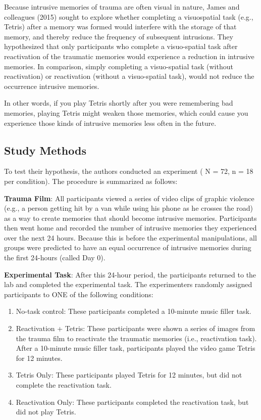 \documentclass[
]{book}
\providecommand{\tightlist}{%
  \setlength{\itemsep}{0pt}\setlength{\parskip}{0pt}}
\begin{document}
Because intrusive memories of trauma are often visual in nature, James and colleagues (2015) sought to explore whether completing a visuospatial task (e.g., Tetris) after a memory was formed would interfere with the storage of that memory, and thereby reduce the frequency of subsequent intrusions. They hypothesized that only participants who complete a visuo-spatial task after reactivation of the traumatic memories would experience a reduction in intrusive memories. In comparison, simply completing a visuo-spatial task (without reactivation) or reactivation (without a visuo-spatial task), would not reduce the occurrence intrusive memories.

In other words, if you play Tetris shortly after you were remembering bad memories, playing Tetris might weaken those memories, which could cause you experience those kinds of intrusive memories less often in the future.

\hypertarget{study-methods}{%
\subsection{Study Methods}\label{study-methods}}

To test their hypothesis, the authors conducted an experiment ( N = 72, n = 18 per condition). The procedure is summarized as follows:

\textbf{Trauma Film}: All participants viewed a series of video clips of graphic violence (e.g., a person getting hit by a van while using his phone as he crosses the road) as a way to create memories that should become intrusive memories. Participants then went home and recorded the number of intrusive memories they experienced over the next 24 hours. Because this is before the experimental manipulations, all groups were predicted to have an equal occurrence of intrusive memories during the first 24-hours (called Day 0).

\textbf{Experimental Task}: After this 24-hour period, the participants returned to the lab and completed the experimental task. The experimenters randomly assigned participants to ONE of the following conditions:

\begin{enumerate}
\def\labelenumi{\arabic{enumi}.}
\tightlist
\item
  No-task control: These participants completed a 10-minute music filler task.
\item
  Reactivation + Tetris: These participants were shown a series of images from the trauma film to reactivate the traumatic memories (i.e., reactivation task). After a 10-minute music filler task, participants played the video game Tetris for 12 minutes.
\item
  Tetris Only: These participants played Tetris for 12 minutes, but did not complete the reactivation task.
\item
  Reactivation Only: These participants completed the reactivation task, but did not play Tetris.
\end{enumerate}
\end{document}
